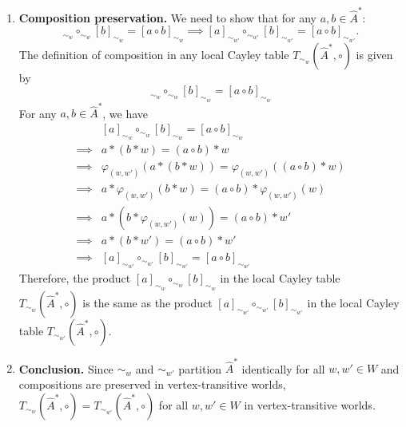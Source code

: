 \begin{proofE}
\begin{enumerate}[(1)]
    \item \textbf{Composition preservation.}
    We need to show that for any $a, b \in \hat{A}^{*}$:
    \begin{equation}
        [a]_{\sim_{w}} \circ_{\sim_{w}} [b]_{\sim_{w}} = [a \circ b]_{\sim_{w}} \implies [a]_{\sim_{w'}} \circ_{\sim_{w'}} [b]_{\sim_{w'}} = [a \circ b]_{\sim_{w'}}.
    \end{equation}
    The definition of composition in any local Cayley table $T_{\sim_{w}}(\hat{A}^{*}, \circ)$ is given by
    \begin{equation}
        [a]_{\sim_{w}} \circ_{\sim_{w}} [b]_{\sim_{w}} = [a \circ b]_{\sim_{w}}
    \end{equation}
    For any $a, b \in \hat{A}^{*}$, we have
    \begin{align}
        & [a]_{\sim_{w}} \circ_{\sim_{w}} [b]_{\sim_{w}} = [a \circ b]_{\sim_{w}} \\
        \implies & a \ast (b \ast w) = (a \circ b) \ast w \\
        \implies & \varphi_{(w,w')}(a \ast (b \ast w)) = \varphi_{(w,w')}((a \circ b) \ast w) \\
        \implies & a \ast \varphi_{(w,w')}(b \ast w) = (a \circ b) \ast \varphi_{(w,w')}(w) \\
        \implies & a \ast (b \ast \varphi_{(w,w')}(w)) = (a \circ b) \ast w' \\
        \implies & a \ast (b \ast w') = (a \circ b) \ast w' \\
        \implies & [a]_{\sim_{w'}} \circ_{\sim_{w'}} [b]_{\sim_{w'}} = [a \circ b]_{\sim_{w'}}
    \end{align}
    Therefore, the product $[a]_{\sim_{w}} \circ_{\sim_{w}} [b]_{\sim_{w}}$ in the local Cayley table $T_{\sim_{w}}(\hat{A}^{*}, \circ)$ is the same as the product $[a]_{\sim_{w'}} \circ_{\sim_{w'}} [b]_{\sim_{w'}}$ in the local Cayley table $T_{\sim_{w'}}(\hat{A}^{*}, \circ)$.
    
    \item \textbf{Conclusion.}
    Since $\sim_{w}$ and $\sim_{w'}$ partition $\hat{A}^{*}$ identically for all $w, w' \in W$ and compositions are preserved in vertex-transitive worlds, $T_{\sim_{w}}(\hat{A}^{*}, \circ) = T_{\sim_{w'}}(\hat{A}^{*}, \circ)$ for all $w, w' \in W$ in vertex-transitive worlds.
\end{enumerate}
\end{proofE}


